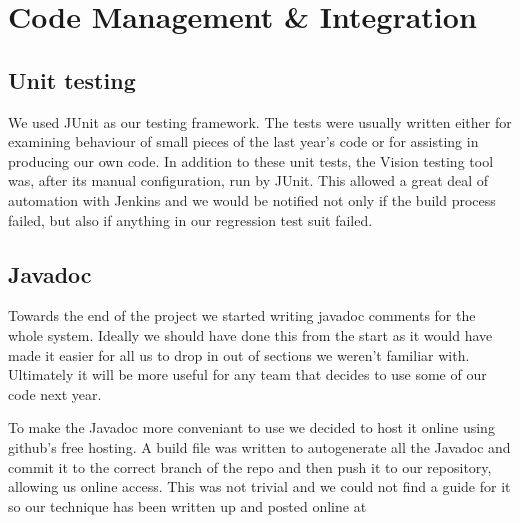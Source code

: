 \section{Code Management \& Integration}


\subsection{Unit testing}
We used JUnit as our testing framework. The tests were usually written either for examining behaviour of small pieces of the last year's code or for assisting in producing our own code. In addition to these unit tests, the Vision testing tool was, after its manual configuration, run by JUnit. This allowed a great deal of automation with Jenkins and we would be notified not only if the build process failed, but also if anything in our regression test suit failed.

\subsection{Javadoc}
Towards the end of the project we started writing javadoc comments for the whole system.  Ideally we should have done this from the start as it would have made it easier for all us to drop in out of sections we weren't familiar with.  Ultimately it will be more useful for any team that decides to use some of our code next year. 

To make the Javadoc more conveniant to use we decided to host it online using github's free hosting.  A build file was written to autogenerate all the Javadoc and commit it to the correct branch of the repo and then push it to our repository, allowing us online access.  This was not trivial and we could not find a guide for it so our technique has been written up and posted online at\cite{javadoc}
